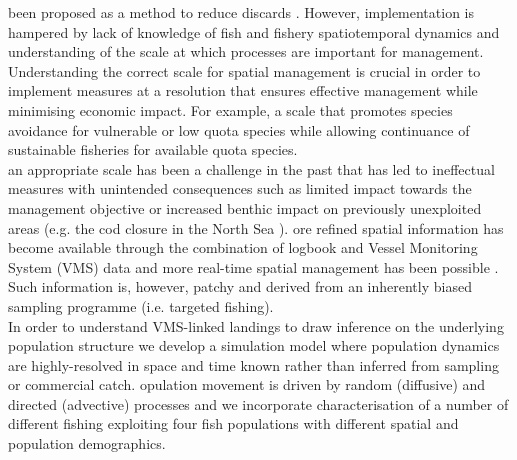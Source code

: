 \documentclass[review]{elsarticle}
\begin{document}
 been proposed as a method to reduce discards
. However,
 implementation is hampered by lack of knowledge of fish
and fishery spatiotemporal dynamics and understanding of the scale at which
processes are important for management. Understanding the correct scale for
spatial management is crucial in order to implement measures at a resolution
that ensures effective management \citep{Dunn2016} while minimising economic
impact.  For example, a scale that promotes species avoidance for vulnerable or
low quota species while allowing continuance of sustainable fisheries for
available quota species.\\

 an
appropriate scale has been a challenge in the past that has led to ineffectual
measures with unintended consequences such as limited impact towards the
management objective or increased benthic impact on previously unexploited
areas (e.g. the cod closure in the North Sea
\citep{Rijnsdorp2001,Dinmore2003}). ore
refined spatial information has  become available through
the combination of logbook and Vessel Monitoring System (VMS) data
\citep{Lee2010, Bastardie2010, Gerritsen2012, Mateo2016} and more real-time
spatial management has been possible \citep[e.g.][]{Holmes2011}.  Such
information is, however, patchy and derived from an inherently biased sampling
programme (i.e. targeted fishing). \\ 

In order to understand  VMS-linked landings to draw inference on the underlying
population structure we develop a simulation model where population dynamics
are highly-resolved in space and time
known  rather than inferred from sampling or commercial
catch. opulation movement is driven by random (diffusive) and directed
(advective) processes and we incorporate characterisation of a number of
different fishing  exploiting four fish populations
with different spatial and population demographics.\\
\end{document}
